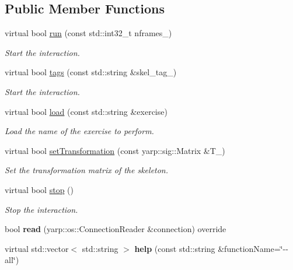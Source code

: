 \subsection*{Public Member Functions}
\begin{DoxyCompactItemize}
\item 
virtual bool \mbox{\hyperlink{classactionRecognizer__IDL_a6e56afcbbc3a7c79deb5a7253b1d0b81}{run}} (const std\+::int32\+\_\+t nframes\+\_\+)
\begin{DoxyCompactList}\small\item\em Start the interaction. \end{DoxyCompactList}\item 
virtual bool \mbox{\hyperlink{classactionRecognizer__IDL_ad36ae79c77c3f38322202013ea418d84}{tags}} (const std\+::string \&skel\+\_\+tag\+\_\+)
\begin{DoxyCompactList}\small\item\em Start the interaction. \end{DoxyCompactList}\item 
virtual bool \mbox{\hyperlink{classactionRecognizer__IDL_a59683b66e727607a3e12c0ab22d2d069}{load}} (const std\+::string \&exercise)
\begin{DoxyCompactList}\small\item\em Load the name of the exercise to perform. \end{DoxyCompactList}\item 
virtual bool \mbox{\hyperlink{classactionRecognizer__IDL_a6fab377e711dc0334dec6442dfdfec5d}{set\+Transformation}} (const yarp\+::sig\+::\+Matrix \&T\+\_\+)
\begin{DoxyCompactList}\small\item\em Set the transformation matrix of the skeleton. \end{DoxyCompactList}\item 
virtual bool \mbox{\hyperlink{classactionRecognizer__IDL_ad1f380a935e15eece41825108b7c1e0e}{stop}} ()
\begin{DoxyCompactList}\small\item\em Stop the interaction. \end{DoxyCompactList}\item 
\mbox{\label{classactionRecognizer__IDL_a2463d7355fa63dcd24c38f094da78f55}} 
bool {\bfseries read} (yarp\+::os\+::\+Connection\+Reader \&connection) override
\item 
\mbox{\label{classactionRecognizer__IDL_a7c4f8453a315988f5b8fa862dc768100}} 
virtual std\+::vector$<$ std\+::string $>$ {\bfseries help} (const std\+::string \&function\+Name=\char`\"{}-\/-\/all\char`\"{})
\end{DoxyCompactItemize}


